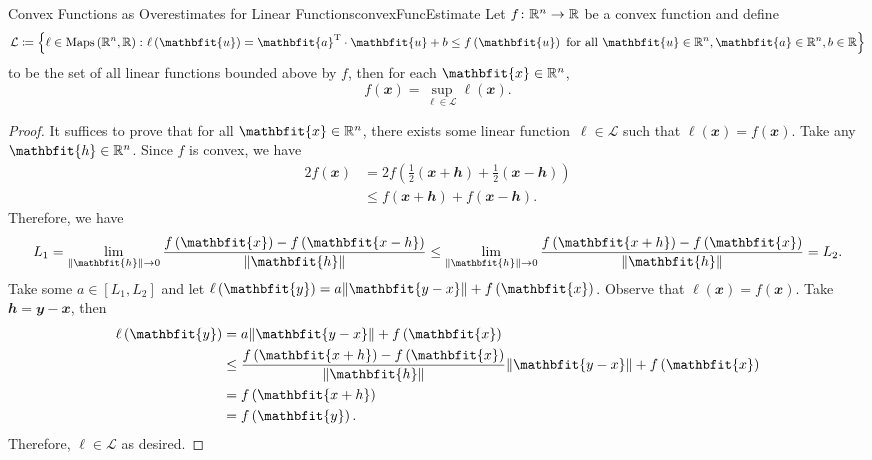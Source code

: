 \documentclass[math, code]{amznotes}
\theoremstyle{remark}
\begin{document}
\begin{probox}{Convex Functions as Overestimates for Linear Functions}{convexFuncEstimate}
    Let $f \colon \mathbb{R}^n \to \mathbb{R}$ be a convex function and define 
    \begin{equation*}
        \mathcal{L} \coloneqq \left\{\ell \in \mathrm{Maps}\left(\R^n, \R\right) \colon \ell\left(\mathbfit{u}\right) = \mathbfit{a}^{\mathrm{T}} \cdot \mathbfit{u} + b \leq f\left(\mathbfit{u}\right) \textrm{ for all } \mathbfit{u} \in \R^n, \mathbfit{a} \in \R^n, b \in \R\right\}
    \end{equation*}
    to be the set of all linear functions bounded above by $f$, then for each $\mathbfit{x} \in \R^n$, 
    \begin{equation*}
        f\left(\mathbfit{x}\right) = \sup_{\ell \in \mathcal{L}}\ell\left(\mathbfit{x}\right).
    \end{equation*}
    \tcblower
    \begin{proof}
        It suffices to prove that for all $\mathbfit{x} \in \R^n$, there exists some linear function~$\ell \in \mathcal{L}$ such that $\ell\left(\mathbfit{x}\right) = f\left(\mathbfit{x}\right)$. Take any $\mathbfit{h} \in \R^n$. Since $f$ is convex, we have 
        \begin{align*}
            2f\left(\mathbfit{x}\right) & = 2f\left(\frac{1}{2}\left(\mathbfit{x + h}\right) + \frac{1}{2}\left(\mathbfit{x - h}\right)\right) \\
            & \leq f\left(\mathbfit{x + h}\right) + f\left(\mathbfit{x - h}\right).
        \end{align*}
        Therefore, we have
        \begin{equation*}
            L_1 = \lim_{\norm{\mathbfit{h}} \to 0}\frac{f\left(\mathbfit{x}\right) - f\left(\mathbfit{x - h}\right)}{\norm{\mathbfit{h}}} \leq \lim_{\norm{\mathbfit{h}} \to 0}\frac{f\left(\mathbfit{x + h}\right) - f\left(\mathbfit{x}\right)}{\norm{\mathbfit{h}}} = L_2.
        \end{equation*}
        Take some $a \in [L_1, L_2]$ and let $\ell\left(\mathbfit{y}\right) = a\norm{\mathbfit{y - x}} + f\left(\mathbfit{x}\right)$. Observe that $\ell\left(\mathbfit{x}\right) = f\left(\mathbfit{x}\right)$. Take $\mathbfit{h} = \mathbfit{y - x}$, then 
        \begin{align*}
            \ell\left(\mathbfit{y}\right) & = a\norm{\mathbfit{y - x}} + f\left(\mathbfit{x}\right) \\
            & \leq \frac{f\left(\mathbfit{x + h}\right) - f\left(\mathbfit{x}\right)}{\norm{\mathbfit{h}}}\norm{\mathbfit{y - x}} + f\left(\mathbfit{x}\right) \\
            & = f\left(\mathbfit{x + h}\right) \\
            & = f\left(\mathbfit{y}\right).
        \end{align*} 
        Therefore, $\ell \in \mathcal{L}$ as desired.
    \end{proof}
\end{probox}
\end{document}
